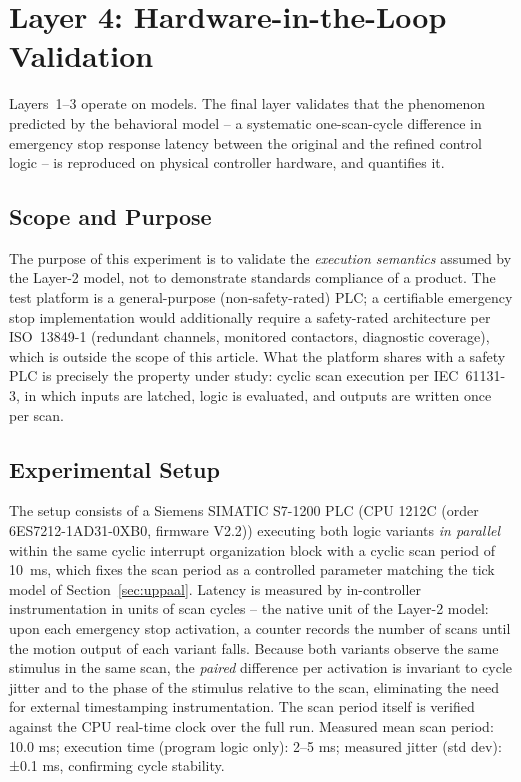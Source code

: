 \documentclass{ieeeaccess}
\theoremstyle{definition}
\begin{document}
\section{Layer 4: Hardware-in-the-Loop Validation}
\label{sec:hil}

Layers~1--3 operate on models. The final layer validates that the phenomenon predicted by the behavioral model -- a systematic one-scan-cycle difference in emergency stop response latency between the original and the refined control logic -- is reproduced on physical controller hardware, and quantifies it.

\subsection{Scope and Purpose}
The purpose of this experiment is to validate the \emph{execution semantics} assumed by the Layer-2 model, not to demonstrate standards compliance of a product. The test platform is a general-purpose (non-safety-rated) PLC; a certifiable emergency stop implementation would additionally require a safety-rated architecture per ISO~13849-1 (redundant channels, monitored contactors, diagnostic coverage), which is outside the scope of this article. What the platform shares with a safety PLC is precisely the property under study: cyclic scan execution per IEC~61131-3, in which inputs are latched, logic is evaluated, and outputs are written once per scan.

\subsection{Experimental Setup}
The setup consists of a Siemens SIMATIC S7-1200 PLC (CPU 1212C (order 6ES7212-1AD31-0XB0, firmware V2.2)) executing both logic variants \emph{in parallel} within the same cyclic interrupt organization block with a cyclic scan period of 10~ms, which fixes the scan period as a controlled parameter matching the tick model of Section~\ref{sec:uppaal}. Latency is measured by in-controller instrumentation in units of scan cycles -- the native unit of the Layer-2 model: upon each emergency stop activation, a counter records the number of scans until the motion output of each variant falls. Because both variants observe the same stimulus in the same scan, the \emph{paired} difference per activation is invariant to cycle jitter and to the phase of the stimulus relative to the scan, eliminating the need for external timestamping instrumentation. The scan period itself is verified against the CPU real-time clock over the full run. Measured mean scan period: 10.0 ms; execution time (program logic only): 2--5 ms; measured jitter (std dev): ±0.1 ms, confirming cycle stability.
\end{document}
